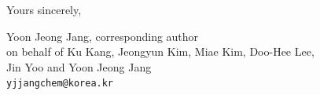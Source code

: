 \documentclass[11pt,a4paper]{article}
\begin{document}
Yours sincerely,

\vspace{5pt}

Yoon Jeong Jang, corresponding author\\
on behalf of Ku Kang, Jeongyun Kim, Miae Kim, Doo-Hee Lee,\\
Jin Yoo and Yoon Jeong Jang\\
\texttt{yjjangchem@korea.kr}

\end{document}
